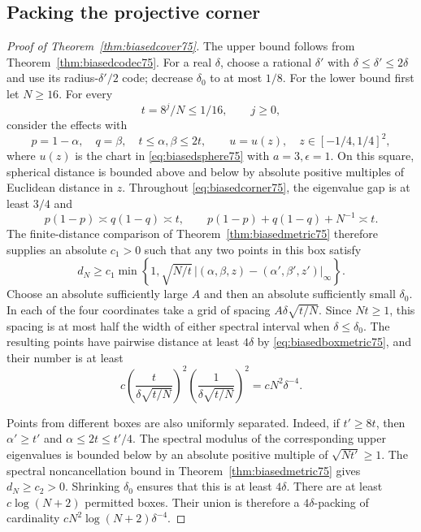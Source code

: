 \subsection{Packing the projective corner}
\begin{proof}[Proof of Theorem~\ref{thm:biasedcover75}]
The upper bound follows from Theorem~\ref{thm:biasedcodec75}. For a
real $\delta$, choose a rational $\delta'$ with
$\delta\le\delta'\le2\delta$ and use its radius-$\delta'/2$ code;
decrease $\delta_0$ to at most $1/8$. For the lower bound first let
$N\ge16$. For every
\[
                     t=8^j/N\le1/16,\qquad j\ge0,
\]
consider the effects with
\begin{equation}\label{eq:biasedcorner75}
 p=1-\alpha,\quad q=\beta,\quad
 t\le\alpha,\beta\le2t,\qquad
 u=u(z),\quad z\in[-1/4,1/4]^2,
\end{equation}
where $u(z)$ is the chart in \eqref{eq:biasedsphere75} with
$a=3,\epsilon=1$. On this square, spherical distance is bounded
above and below by absolute positive multiples of Euclidean distance
in $z$. Throughout \eqref{eq:biasedcorner75}, the eigenvalue gap is
at least $3/4$ and
\[
 p(1-p)\asymp q(1-q)\asymp t,\qquad
 p(1-p)+q(1-q)+N^{-1}\asymp t.
\]
The finite-distance comparison of Theorem~\ref{thm:biasedmetric75}
therefore supplies an absolute $c_1>0$ such that any two points in
this box satisfy
\begin{equation}\label{eq:biasedboxmetric75}
 d_N\ge c_1\min\left\{1,
       \sqrt{N/t}\,
       \bigl| (\alpha,\beta,z)-
              (\alpha',\beta',z')\bigr|_\infty\right\}.
\end{equation}
Choose an absolute sufficiently large $A$ and then an absolute
sufficiently small $\delta_0$. In each of the four coordinates take
a grid of spacing $A\delta\sqrt{t/N}$. Since $Nt\ge1$, this spacing
is at most half the width of either spectral interval when
$\delta\le\delta_0$. The resulting points have pairwise distance
at least $4\delta$ by \eqref{eq:biasedboxmetric75}, and their number
is at least
\[
 c\left(\frac{t}{\delta\sqrt{t/N}}\right)^2
   \left(\frac1{\delta\sqrt{t/N}}\right)^2
                         =cN^2\delta^{-4}.
\]

Points from different boxes are also uniformly separated. Indeed,
if $t'\ge8t$, then $\alpha'\ge t'$ and $\alpha\le2t\le t'/4$.
The spectral modulus of the corresponding upper eigenvalues is
bounded below by an absolute positive multiple of
$\sqrt{Nt'}\ge1$. The spectral noncancellation bound in
Theorem~\ref{thm:biasedmetric75} gives $d_N\ge c_2>0$.
Shrinking $\delta_0$ ensures that this is at least $4\delta$.
There are at least $c\log(N+2)$ permitted boxes. Their union is
therefore a $4\delta$-packing of cardinality
$cN^2\log(N+2)\delta^{-4}$.


\end{proof}
